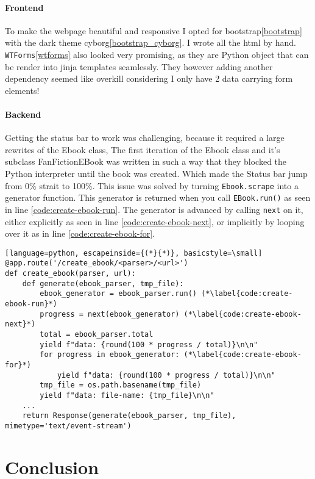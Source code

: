 \documentclass[]{report}   %
\begin{document}
\subsubsection{Frontend}
To make the webpage beautiful and responsive I opted for bootstrap\ref{bootstrap} with the
dark theme cyborg\ref{bootstrap_cyborg}. I wrote all the html by hand.
\texttt{WTForms}\ref{wtforms} also looked very promising, as they are Python object that
can be render into jinja templates seamlessly. They however adding another
dependency seemed like overkill considering I only have 2 data carrying form
elements!

\subsubsection{Backend}
Getting the status bar to work was challenging, because it required a large
rewrites of the Ebook class, The first iteration of the Ebook class and it's
subclass FanFictionEBook was written in such a way that they blocked the Python
interpreter until the book was created. Which made the Status bar jump from 0\% strait
to 100\%. This issue was solved by turning \texttt{Ebook.scrape}
into a generator function. This generator is returned when you call
\texttt{EBook.run()} as seen in line \ref{code:create-ebook-run}. The generator is
advanced by calling \texttt{next} on it, either explicitly as seen in
line \ref{code:create-ebook-next}, or implicitly by looping over it as in line
\ref{code:create-ebook-for}.

\begin{lstlisting}[language=python, escapeinside={(*}{*)}, basicstyle=\small]
@app.route('/create_ebook/<parser>/<url>')
def create_ebook(parser, url):
    def generate(ebook_parser, tmp_file):
		ebook_generator = ebook_parser.run() (*\label{code:create-ebook-run}*)
		progress = next(ebook_generator) (*\label{code:create-ebook-next}*)
        total = ebook_parser.total
        yield f"data: {round(100 * progress / total)}\n\n"
		for progress in ebook_generator: (*\label{code:create-ebook-for}*)
            yield f"data: {round(100 * progress / total)}\n\n"
        tmp_file = os.path.basename(tmp_file)
        yield f"data: file-name: {tmp_file}\n\n"
	...
    return Response(generate(ebook_parser, tmp_file), mimetype='text/event-stream')
\end{lstlisting}



\chapter{Conclusion}


\begin{thebibliography}{9}
\end{thebibliography}
\end{document}
